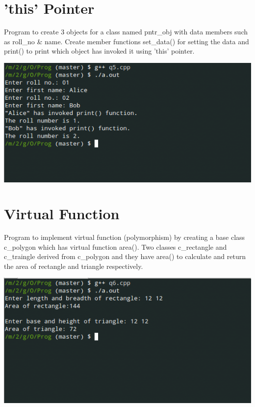 \documentclass[oneside, a4paper,11pt]{book}
\begin{document}
\section{'this' Pointer}

Program to create 3 objects for a class named pntr\_obj with data members such as roll\_no \& name. Create member functions set\_data() for setting the data and print() to print which object has invoked it using 'this' pointer.


\includegraphics[width=\textwidth]{q5.png}

\section{Virtual Function}

Program to implement virtual function (polymorphism) by creating a base class c\_polygon which has virtual function area(). Two classes c\_rectangle and c\_traingle derived from c\_polygon and they have area() to calculate and return the area of rectangle and triangle respectively. 


\includegraphics[width=\textwidth]{q6.png}
\end{document}
